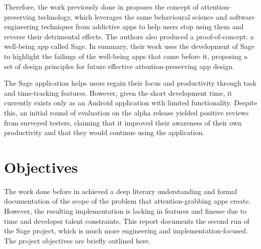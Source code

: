 Therefore, the work previously done in \cite{sagePaper2020} proposes the concept of attention-preserving technology, which leverages the same behavioural science and software engineering techniques from addictive apps to help users stop using them and reverse their detrimental effects. The authors also produced a proof-of-concept: a well-being app called Sage. In summary, their work uses the development of Sage to highlight the failings of the well-being apps that came before it, proposing a set of design principles for future effective attention-preserving app design.

The Sage application helps users regain their focus and productivity through task and time-tracking features. However, given the short development time, it currently exists only as an Android application with limited functionality. Despite this, an initial round of evaluation on the alpha release yielded positive reviews from surveyed testers, claiming that it improved their awareness of their own productivity and that they would continue using the application.

\section{Objectives}
The work done before in \cite{sagePaper2020} achieved a deep literary understanding and formal documentation of the scope of the problem that attention-grabbing apps create. However, the resulting implementation is lacking in features and finesse due to time and developer talent constraints. This report documents the second run of the Sage project, which is much more engineering and implementation-focused. The project objectives are briefly outlined here.

